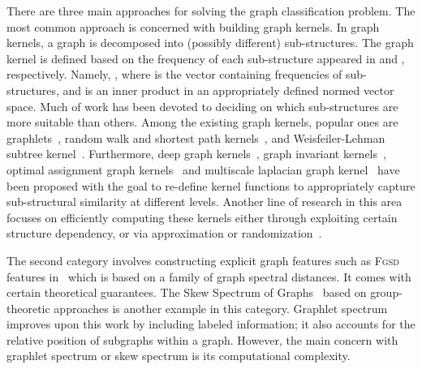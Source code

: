 \documentclass{article}
\begin{document}
There are three main approaches for solving the graph classification problem. The most common approach is concerned with building graph kernels. In graph kernels, a graph  is decomposed into (possibly different)  sub-structures. The graph kernel    is defined based on the frequency of each sub-structure appeared in  and , respectively. Namely, , where  is the vector containing  frequencies of   sub-structures, and  is an inner product in an appropriately defined normed vector space. Much of work has been devoted to deciding on which sub-structures are more suitable than  others. Among the existing graph kernels, popular ones are  graphlets~\cite{prvzulj2007biological,shervashidze2009efficient}, random walk and shortest path kernels~\cite{kashima2003marginalized,borgwardt2005shortest}, and Weisfeiler-Lehman subtree kernel~\cite{shervashidze2011weisfeiler}. Furthermore, deep graph kernels~\cite{yanardag2015deep}, graph invariant  kernels~\cite{orsini2015graph}, optimal  assignment graph kernels~\cite{kriege2016valid}  and  multiscale laplacian graph kernel~\cite{kondor2016multiscale}  have been proposed with the goal to re-define kernel functions   to appropriately capture sub-structural similarity at different levels.  Another line of research in this area focuses on  efficiently computing  these kernels either through exploiting certain structure dependency, or via approximation or randomization~\cite{feragen2013scalable,de2013fast,neumann2012efficient}.  







The second category involves constructing explicit graph features such as  \textsc{Fgsd} features in~\cite{verma2017hunt} which is based on a family of graph spectral distances. It comes with certain theoretical guarantees. The Skew Spectrum of Graphs~\cite{kondor2008skew} based on group-theoretic approaches  is another  example in this category. Graphlet spectrum~\cite{kondor2009graphlet}  improves upon this work by including   labeled information; it also accounts for the relative position of subgraphs  within a graph. However, the main concern with   graphlet spectrum or  skew spectrum is its computational  complexity. 
\end{document}
